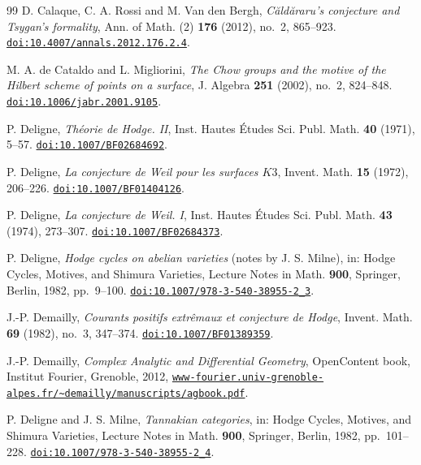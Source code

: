 \begin{thebibliography}{99}
D. Calaque, C. A. Rossi and M. Van den Bergh,
\emph{C\u{a}ld\u{a}raru's conjecture and Tsygan's formality},
Ann. of Math. (2) \textbf{176} (2012), no.~2, 865--923.
\href{https://doi.org/10.4007/annals.2012.176.2.4}{\texttt{doi:10.4007/annals.2012.176.2.4}}.

M. A. de Cataldo and L. Migliorini,
\emph{The Chow groups and the motive of the Hilbert scheme of points on a
surface},
J. Algebra \textbf{251} (2002), no.~2, 824--848.
\href{https://doi.org/10.1006/jabr.2001.9105}{\texttt{doi:10.1006/jabr.2001.9105}}.

P. Deligne,
\emph{Th\'eorie de Hodge. II},
Inst. Hautes \'Etudes Sci. Publ. Math. \textbf{40} (1971), 5--57.
\href{https://doi.org/10.1007/BF02684692}{\texttt{doi:10.1007/BF02684692}}.

P. Deligne,
\emph{La conjecture de Weil pour les surfaces $K3$},
Invent. Math. \textbf{15} (1972), 206--226.
\href{https://doi.org/10.1007/BF01404126}{\texttt{doi:10.1007/BF01404126}}.

P. Deligne,
\emph{La conjecture de Weil. I},
Inst. Hautes \'Etudes Sci. Publ. Math. \textbf{43} (1974), 273--307.
\href{https://doi.org/10.1007/BF02684373}{\texttt{doi:10.1007/BF02684373}}.

P. Deligne,
\emph{Hodge cycles on abelian varieties} (notes by J. S. Milne),
in: Hodge Cycles, Motives, and Shimura Varieties,
Lecture Notes in Math. \textbf{900}, Springer, Berlin, 1982, pp.~9--100.
\href{https://doi.org/10.1007/978-3-540-38955-2_3}%
{\texttt{doi:10.1007/978-3-540-38955-2\_3}}.

J.-P. Demailly,
\emph{Courants positifs extr\^emaux et conjecture de Hodge},
Invent. Math. \textbf{69} (1982), no.~3, 347--374.
\href{https://doi.org/10.1007/BF01389359}{\texttt{doi:10.1007/BF01389359}}.

J.-P. Demailly,
\emph{Complex Analytic and Differential Geometry},
OpenContent book, Institut Fourier, Grenoble, 2012,
\href{https://www-fourier.univ-grenoble-alpes.fr/~demailly/manuscripts/agbook.pdf}{\texttt{www-fourier.univ-grenoble-alpes.fr/\~{}demailly/manuscripts/agbook.pdf}}.

P. Deligne and J. S. Milne,
\emph{Tannakian categories},
in: Hodge Cycles, Motives, and Shimura Varieties,
Lecture Notes in Math. \textbf{900}, Springer, Berlin, 1982, pp.~101--228.
\href{https://doi.org/10.1007/978-3-540-38955-2_4}%
{\texttt{doi:10.1007/978-3-540-38955-2\_4}}.


\end{thebibliography}
